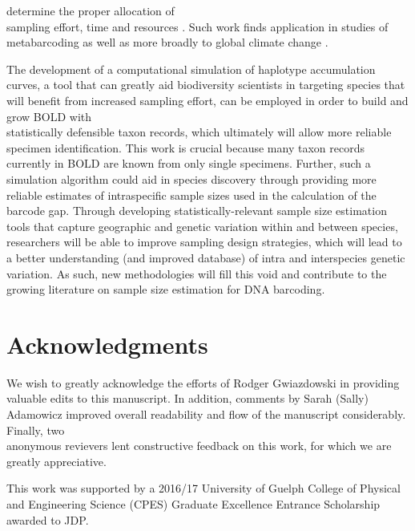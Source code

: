determine the proper allocation of \\ sampling effort, time and resources \cite{hortal2005ed}. Such work finds application in studies of \\ metabarcoding \cite{wares2015can} as well as more broadly to global climate change \cite{pfenninger2012methodological}.

\vspace{5mm}

The development of a computational simulation of haplotype accumulation curves, a tool that can greatly aid biodiversity scientists in targeting species that will benefit from increased sampling effort, can be employed in order to build and grow BOLD with \\ statistically defensible taxon records, which ultimately will allow more reliable specimen identification. This work is crucial because many taxon records currently in BOLD are known from only single specimens. Further, such a simulation algorithm could aid in species discovery through providing more reliable estimates of intraspecific sample sizes used in the calculation of the barcode gap. Through developing statistically-relevant sample size estimation tools that capture geographic and genetic variation within and between species, researchers will be able to improve sampling design strategies, which will lead to a better understanding (and improved database) of intra and interspecies genetic variation. As such, new methodologies will fill this void and contribute to the growing literature on sample size estimation for DNA barcoding.

\newpage

\section*{Acknowledgments}

We wish to greatly acknowledge the efforts of Rodger Gwiazdowski in providing \\ valuable edits to this manuscript. In addition, comments by Sarah (Sally) Adamowicz improved overall readability and flow of the manuscript considerably. Finally, two \\ anonymous revievers lent constructive feedback on this work, for which we are greatly appreciative.

\vspace{5mm}

This work was supported by a 2016/17 University of Guelph College of Physical and Engineering Science (CPES) Graduate Excellence Entrance Scholarship awarded to JDP.

